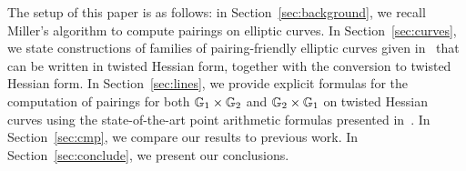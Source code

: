 The setup of this paper is as follows:
in Section~\ref{sec:background}, we recall Miller's algorithm to compute pairings on elliptic curves.
In Section~\ref{sec:curves}, we state constructions of families of pairing-friendly elliptic curves given in~\cite{2010/freeman}
that can be written in twisted Hessian form, together with the conversion
to twisted Hessian form.
In Section~\ref{sec:lines}, we provide explicit formulas for the computation of 
pairings for both $\mathbb{G}_{1} \times \mathbb{G}_{2}$ and $\mathbb{G}_{2} \times \mathbb{G}_{1}$ 
on twisted Hessian curves
using the state-of-the-art point arithmetic formulas presented in~\cite{2015/hessian}.
In Section~\ref{sec:cmp}, we compare our results to previous work.
In Section~\ref{sec:conclude}, we present our conclusions.
\fi



